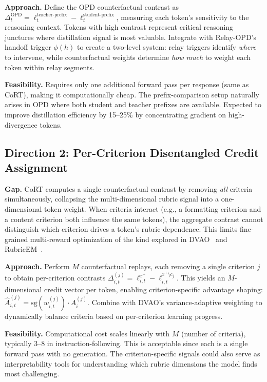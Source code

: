 \documentclass[11pt,a4paper]{article}
\begin{document}
\textbf{Approach.} Define the OPD counterfactual contrast as $\Delta^{\text{OPD}}_{t} = \ell^{\text{teacher-prefix}}_{t} - \ell^{\text{student-prefix}}_{t}$, measuring each token's sensitivity to the reasoning context. Tokens with high contrast represent critical reasoning junctures where distillation signal is most valuable. Integrate with Relay-OPD's handoff trigger $\phi(h)$ to create a two-level system: relay triggers identify \emph{where} to intervene, while counterfactual weights determine \emph{how much} to weight each token within relay segments.

\textbf{Feasibility.} Requires only one additional forward pass per response (same as CoRT), making it computationally cheap. The prefix-comparison setup naturally arises in OPD where both student and teacher prefixes are available. Expected to improve distillation efficiency by 15--25\% by concentrating gradient on high-divergence tokens.

\subsection{Direction 2: Per-Criterion Disentangled Credit Assignment}

\textbf{Gap.} CoRT computes a single counterfactual contrast by removing \emph{all} criteria simultaneously, collapsing the multi-dimensional rubric signal into a one-dimensional token weight. When criteria interact (e.g., a formatting criterion and a content criterion both influence the same tokens), the aggregate contrast cannot distinguish which criterion drives a token's rubric-dependence. This limits fine-grained multi-reward optimization of the kind explored in DVAO~\cite{dvao2026} and RubricEM~\cite{rubricem2026}.

\textbf{Approach.} Perform $M$ counterfactual replays, each removing a single criterion $j$ to obtain per-criterion contrasts $\Delta^{(j)}_{i,t} = \ell^{x^+}_{i,t} - \ell^{x^+ \setminus c_j}_{i,t}$. This yields an $M$-dimensional credit vector per token, enabling criterion-specific advantage shaping: $\hat{A}^{(j)}_{i,t} = \text{sg}(w^{(j)}_{i,t}) \cdot A^{(j)}_i$. Combine with DVAO's variance-adaptive weighting to dynamically balance criteria based on per-criterion learning progress.

\textbf{Feasibility.} Computational cost scales linearly with $M$ (number of criteria), typically 3--8 in instruction-following. This is acceptable since each is a single forward pass with no generation. The criterion-specific signals could also serve as interpretability tools for understanding which rubric dimensions the model finds most challenging.
\end{document}

